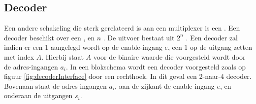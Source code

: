 \subsection{Decoder}
\label{ss:decoder}
Een andere schakeling die sterk gerelateerd is aan een multiplexer is een . Een decoder beschikt over een , en $n$ . De uitvoer bestaat uit $2^n$ . Een decoder zal indien er een 1 aangelegd wordt op de enable-ingang $e$, een 1 op de uitgang zetten met index $A$. Hierbij staat $A$ voor de binaire waarde die voorgesteld wordt door de adres-ingangen $a_i$. In een blokschema wordt een decoder voorgesteld zoals op figuur \ref{fig:decoderInterface} door een rechthoek. In dit geval een 2-naar-4 decoder. Bovenaan staat de adres-ingangen $a_i$, aan de zijkant de enable-ingang $e$, en onderaan de uitgangen $s_i$.
